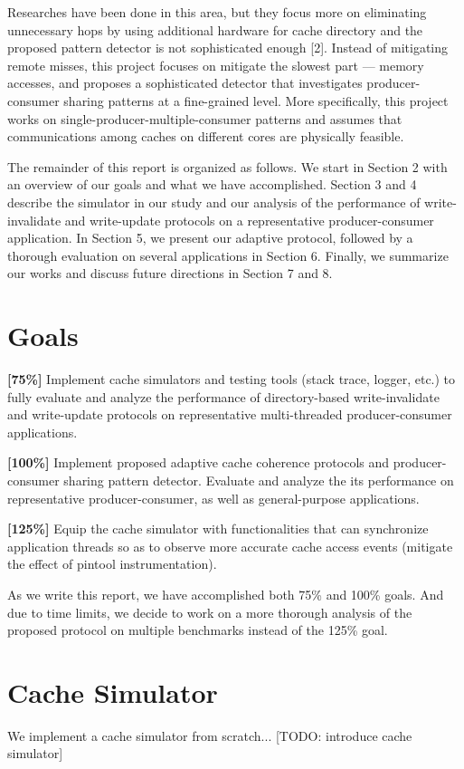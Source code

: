 \documentclass[conference]{IEEEtran}
\begin{document}
Researches have been done in this area, but they focus more on eliminating unnecessary hops by using additional hardware for cache directory and the proposed pattern detector is not sophisticated enough [2]. Instead of mitigating remote misses, this project focuses on mitigate the slowest part --- memory accesses, and proposes a sophisticated detector that investigates producer-consumer sharing patterns at a fine-grained level. More specifically, this project works on single-producer-multiple-consumer patterns and assumes that communications among caches on different cores are physically feasible.

The remainder of this report is organized as follows. We start in Section 2 with an overview of our goals and what we have accomplished. Section 3 and 4 describe the simulator in our study and our analysis of the performance of write-invalidate and write-update protocols on a representative producer-consumer application. In Section 5, we present our adaptive protocol, followed by a thorough evaluation on several applications in Section 6. Finally, we summarize our works and discuss future directions in Section 7 and 8.


\section{Goals}

\textbf{[75\%]} Implement cache simulators and testing tools (stack trace, logger, etc.) to fully evaluate and analyze the performance of directory-based write-invalidate and write-update protocols on representative multi-threaded producer-consumer applications.

\textbf{[100\%]} Implement proposed adaptive cache coherence protocols and producer-consumer sharing pattern detector. Evaluate and analyze the its performance on representative producer-consumer, as well as general-purpose applications.

\textbf{[125\%]} Equip the cache simulator with functionalities that can synchronize application threads so as to observe more accurate cache access events (mitigate the effect of pintool instrumentation).

As we write this report, we have accomplished both 75\% and 100\% goals. And due to time limits, we decide to work on a more thorough analysis of the proposed protocol on multiple benchmarks instead of the 125\% goal.


\section{Cache Simulator}
We implement a cache simulator from scratch... [TODO: introduce cache simulator]
\end{document}
